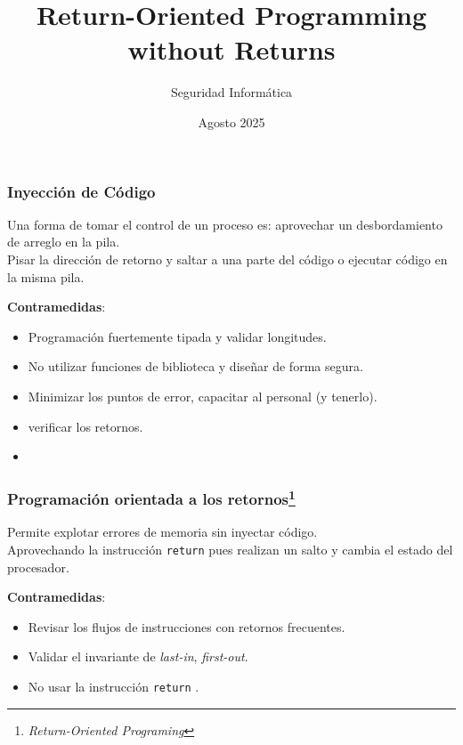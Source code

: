 \documentclass{beamer}
\title[ROP without Returns] %
{Return-Oriented Programming without Returns}
\subtitle{
}
\author[] %
{
    Seguridad Informática 
}
\institute[LCC - FCEIA] %
{
    Facultad de Ciencias Exactas, Ingeniería y Agrimensura\\Universidad Nacional de Rosario
}
\date[Seguridad Informática] %
{Agosto 2025}
\newcommand { \return } {\texttt{return} }
\begin{document}
\frame{
    \titlepage
}

\begin{frame}
    \frametitle{Inyección de Código}
    Una forma de tomar el control de un proceso es: aprovechar un desbordamiento de arreglo en la pila.\\
    
    Pisar la dirección de retorno y saltar a una parte del código o ejecutar código en la misma pila.\\

    \pause

    \textbf{Contramedidas}:
    \begin{itemize}
        \item<2-> Programación fuertemente tipada y validar longitudes.
        \item<2-> No utilizar funciones de biblioteca y diseñar de forma segura.
        \item<2-> Minimizar los puntos de error, capacitar al personal (y tenerlo).
        \item<2-> verificar los retornos.
        \item<2->  
    \end{itemize}
\end{frame}

\begin{frame}
    \frametitle{Programación orientada a los retornos\footnote{\textit{Return-Oriented Programing}}}
    Permite explotar errores de memoria sin inyectar código. \\
    
    Aprovechando la instrucción \return pues realizan un salto y cambia el estado del procesador.\\
    
    \pause
    
    \textbf{Contramedidas}:
    \begin{itemize}
        \item<2-> Revisar los flujos de instrucciones con retornos frecuentes. 
        \item<2-> Validar el invariante de \textit{last-in}, \textit{first-out}.
        \item<2-> No usar la instrucción \return.
    \end{itemize}
\end{frame}
\end{document}

